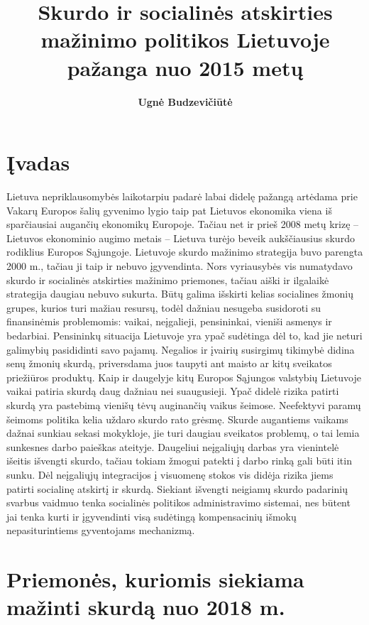 \documentclass[12pt,titlepage]{article}
\title{\textbf{Skurdo ir socialinės atskirties mažinimo politikos Lietuvoje pažanga nuo 2015 metų}}
\author{\textbf{Ugnė Budzevičiūtė}}
\begin{document}
\maketitle
\tableofcontents
\newpage

\section{Įvadas}

\justify
\hspace{\parindent} Lietuva nepriklausomybės laikotarpiu padarė labai didelę pažangą artėdama prie Vakarų Europos šalių gyvenimo lygio taip pat Lietuvos ekonomika viena iš sparčiausiai augančių ekonomikų Europoje. Tačiau net ir prieš 2008 metų krizę – Lietuvos ekonominio augimo metais – Lietuva turėjo beveik aukščiausius skurdo rodiklius Europos Sąjungoje. Lietuvoje skurdo mažinimo strategija buvo parengta 2000 m., tačiau ji taip ir nebuvo įgyvendinta. Nors vyriausybės vis numatydavo skurdo ir socialinės atskirties mažinimo priemones, tačiau aiški ir ilgalaikė strategija daugiau nebuvo sukurta. Būtų galima išskirti kelias socialines žmonių grupes, kurios turi mažiau resursų, todėl dažniau nesugeba susidoroti su finansinėmis problemomis: vaikai, neįgalieji, pensininkai, vieniši asmenys ir bedarbiai. Pensininkų situacija Lietuvoje yra ypač sudėtinga dėl to, kad jie neturi galimybių pasididinti savo pajamų. Negalios ir įvairių susirgimų tikimybė didina senų žmonių skurdą, priversdama juos taupyti ant maisto ar kitų sveikatos priežiūros produktų. Kaip ir daugelyje kitų Europos Sąjungos valstybių Lietuvoje vaikai patiria skurdą daug dažniau nei suaugusieji. Ypač didelė rizika patirti skurdą yra pastebimą vienišų tėvų auginančių vaikus šeimose. Neefektyvi paramų šeimoms politika kelia uždaro skurdo rato grėsmę. Skurde augantiems vaikams dažnai sunkiau sekasi mokykloje, jie turi daugiau sveikatos problemų, o tai lemia sunkesnes darbo paieškas ateityje. Daugeliui neįgaliųjų darbas yra vienintelė išeitis išvengti skurdo, tačiau tokiam žmogui patekti į darbo rinką gali būti itin sunku. Dėl neįgaliųjų integracijos į visuomenę stokos vis didėja rizika jiems patirti socialinę atskirtį ir skurdą. Siekiant išvengti neigiamų skurdo padarinių svarbus vaidmuo tenka socialinės politikos administravimo sistemai, nes būtent jai tenka kurti ir įgyvendinti visą sudėtingą kompensacinių išmokų nepasiturintiems gyventojams mechanizmą.  \parencite{vsileika2000gyventojku}
\justify

\section{Priemonės, kuriomis siekiama mažinti skurdą nuo 2018 m.}
\end{document}
